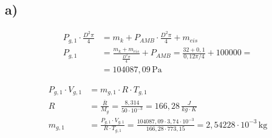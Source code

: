 

\subsection*{a)}

\begin{align*}
P_{g,1} \cdot \frac{D^2 \pi}{4} &= m_k + P_{AMB} \cdot \frac{D^2 \pi}{4} + m_{eis} \\
P_{g,1} &= \frac{m_k + m_{eis}}{\frac{D^2 \pi}{4}} + P_{AMB} = \frac{32 + 0,1}{0,12 \pi / 4} + 100000 = \\
&= 104087,09 \, \text{Pa}
\end{align*}

\begin{align*}
P_{g,1} \cdot V_{g,1} &= m_{g,1} \cdot R \cdot T_{g,1} \\
R &= \frac{\overline{R}}{M_g} = \frac{8,314}{50 \cdot 10^{-3}} = 166,28 \, \frac{J}{kg \cdot K} \\
m_{g,1} &= \frac{P_{g,1} \cdot V_{g,1}}{R \cdot T_{g,1}} = \frac{104087,09 \cdot 3,74 \cdot 10^{-3}}{166,28 \cdot 773,15} = 2,54228 \cdot 10^{-3} \, \text{kg}
\end{align*}